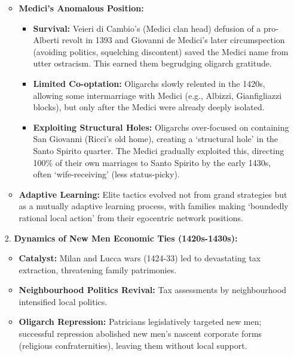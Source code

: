 \documentclass{article}
\begin{document}
\begin{itemize}
\begin{itemize}
            \item \textbf{Medici's Anomalous Position:}
            \begin{itemize}
                \item \textbf{Survival:} Veieri di Cambio's (Medici clan
                head) defusion of a pro-Alberti revolt in 1393 and Giovanni
                de Medici's later circumspection (avoiding politics,
                squelching discontent) saved the Medici name from utter
                ostracism. This earned them begrudging oligarch gratitude.
                \item \textbf{Limited Co-optation:} Oligarchs slowly
                relented in the 1420s, allowing some intermarriage with
                Medici (e.g., Albizzi, Gianfigliazzi blocks), but only after
                the Medici were already deeply isolated.
                \item \textbf{Exploiting Structural Holes:} Oligarchs
                over-focused on containing San Giovanni (Ricci's old home),
                creating a `structural hole' in the Santo Spirito quarter.
                The Medici gradually exploited this, directing 100\% of
                their own marriages to Santo Spirito by the early 1430s,
                often `wife-receiving' (less status-picky).
            \end{itemize}
            \item \textbf{Adaptive Learning:} Elite tactics evolved not from
            grand strategies but as a mutually adaptive learning process,
            with families making `boundedly rational local action' from
            their egocentric network positions.
        \end{itemize}
        \item [$2$.] \textbf{Dynamics of New Men Economic Ties (1420s-1430s):}
        \begin{itemize}
            \item \textbf{Catalyst:} Milan and Lucca wars (1424-33) led to
            devastating tax extraction, threatening family patrimonies.
            \item \textbf{Neighbourhood Politics Revival:} Tax assessments
            by neighbourhood intensified local politics.
            \item \textbf{Oligarch Repression:} Patricians legislatively
            targeted new men; successful repression abolished new men's
            nascent corporate forms (religious confraternities), leaving
            them without local support.

\end{itemize}
\end{itemize}
\end{document}
